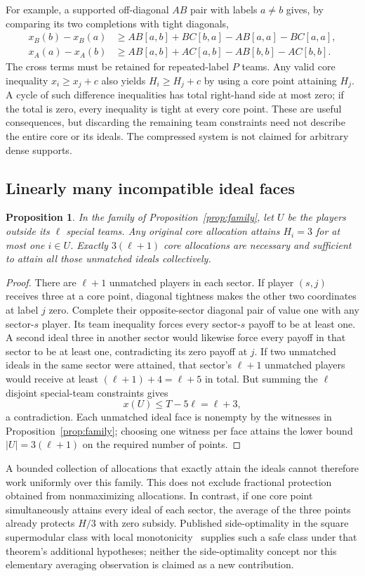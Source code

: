 \documentclass[11pt]{article}
\newtheorem{proposition}[theorem]{Proposition}
\theoremstyle{remark}
\begin{document}
For example, a supported off-diagonal $AB$ pair with labels $a\ne b$
gives, by comparing its two completions with tight diagonals,
\begin{align*}
 x_B(b)-x_B(a)&\ge AB[a,b]+BC[b,a]-AB[a,a]-BC[a,a],\\
 x_A(a)-x_A(b)&\ge AB[a,b]+AC[a,b]-AB[b,b]-AC[b,b].
\end{align*}
The cross terms must be retained for repeated-label $P$ teams. Any valid
core inequality $x_i\ge x_j+c$ also yields $H_i\ge H_j+c$ by using
a core point attaining $H_j$. A cycle of such difference inequalities
has total right-hand side at most zero; if the total is zero, every
inequality is tight at every core point. These are useful consequences,
but discarding the remaining team constraints need not describe the
entire core or its ideals. The compressed system is not claimed for
arbitrary dense supports.

\subsection{Linearly many incompatible ideal faces}
\begin{proposition}\label{anc:attainment}
In the family of Proposition~\ref{prop:family}, let $U$ be the players
outside its $\ell$ special teams. Any original core allocation attains
$H_i=3$ for at most one $i\in U$. Exactly $3(\ell+1)$ core allocations
are necessary and sufficient to attain all those unmatched ideals
collectively.
\end{proposition}
\begin{proof}
There are $\ell+1$ unmatched players in each sector. If player $(s,j)$
receives three at a core point, diagonal tightness makes the other two
coordinates at label $j$ zero. Complete their opposite-sector diagonal
pair of value one with any sector-$s$ player. Its team inequality forces
every sector-$s$ payoff to be at least one.
A second ideal three in another sector would likewise force every
payoff in that sector to be at least one, contradicting its zero payoff
at $j$. If two unmatched ideals in the same sector were attained, that
sector's $\ell+1$ unmatched players would receive at least
$(\ell+1)+4=\ell+5$ in total. But summing the $\ell$ disjoint
special-team constraints gives
\[
                  x(U)\le T-5\ell=\ell+3,
\]
a contradiction. Each unmatched ideal face is nonempty by the witnesses
in Proposition~\ref{prop:family}; choosing one witness per face attains
the lower bound $|U|=3(\ell+1)$ on the required number of points.
\end{proof}
A bounded collection of allocations that exactly attain the ideals
cannot therefore work uniformly over this family. This does not exclude
fractional protection obtained from nonmaximizing allocations. In
contrast, if one core point simultaneously attains every ideal of each
sector, the average of the three points already protects $H/3$ with
zero subsidy. Published side-optimality in the square supermodular class
with local monotonicity~\cite[Theorem~3.2]{Martinez2026} supplies such a
safe class under that theorem's additional hypotheses; neither the
side-optimality concept nor this elementary averaging observation is
claimed as a new contribution.
\end{document}

